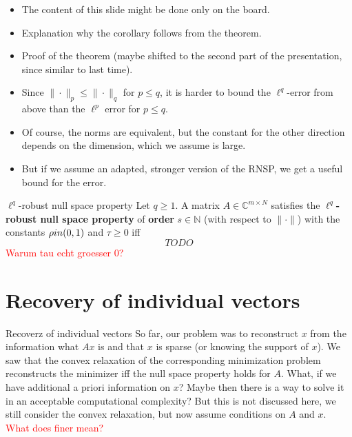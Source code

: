 \documentclass[11pt]{beamer}
\newcommand{\CC}{\mathbb{C}}
\newcommand{\NN}{\mathbb{N}}
\renewcommand{\emph}{\textbf}
\begin{document}
\begin{frame}{}
    \begin{itemize}
    	\item The content of this slide might be done only on the board.
    	\item Explanation why the corollary follows from the theorem.
    	\item Proof of the theorem (maybe shifted to the second part of the presentation, since similar to last time).
    \end{itemize}
\end{frame}

\begin{frame}{}
\begin{itemize}
	\item Since \(\|\cdot\|_p\le \|\cdot\|_q\) for \(p\le q\), it is harder to bound the \(\ell^q\)-error from above than the \(\ell^p\) error for \(p\le q\). 
	\item  Of course, the norms are equivalent, but the constant for the other direction depends on the dimension, which we assume is large.
	\item But if we assume an adapted, stronger version of the RNSP, we get a useful bound for the error.
\end{itemize}
\end{frame}

\begin{frame}{}
 \begin{Def}
 {$\ell^q$-robust null space property}{}
 Let \(q\ge 1\). A matrix \(A\in \CC^{m\times N}\) satisfies the \emph{$\ell^q$-robust null space property} of \emph{order} \(s\in \NN\) (with respect to \(\|\cdot\|\)) with the constants \(\rho\\in (0,1)\) and \(\tau\ge0\) iff
 \[TODO\]
 \textcolor{red}{Warum tau echt groesser 0?}
 \end{Def}
 \end{frame}

\section{Recovery of individual vectors}
\begin{frame}{Recoverz of individual vectors}
    So far, our problem was to reconstruct \(x\) from the information what \(Ax\) is and that \(x\) is sparse (or knowing the support of \(x\)). We saw that the convex relaxation of the corresponding minimization problem reconstructs the minimizer iff the null space property holds for \(A\). What, if we have additional a priori information on \(x\)? Maybe then there is a way to solve it in an acceptable computational complexity? But this is not discussed here, we still consider the convex relaxation, but now assume conditions on \(A\) and \(x\). \textcolor{red}{What does finer mean?}
\end{frame}
\end{document}
